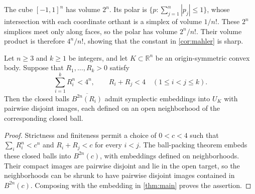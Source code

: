 \begin{remark}\label{rem:cube-volume-product}
The cube $[-1,1]^n$ has volume $2^n$. Its polar is $\{p:\sum_{j=1}^n|p_j|\le1\}$, whose intersection with each coordinate orthant is a simplex of volume $1/n!$. These $2^n$ simplices meet only along faces, so the polar has volume $2^n/n!$. Their volume product is therefore $4^n/n!$, showing that the constant in \cref{cor:mahler} is sharp.
\end{remark}

\begin{corollary}
\label{cor:polar-packings}
Let $n\ge3$ and $k\ge1$ be integers, and let $K\subset\mathbb{R}^n$ be an origin-symmetric convex body. Suppose that $R_1,\ldots,R_k>0$ satisfy
\[
 \sum_{i=1}^k R_i^n<4^n,
 \qquad R_i+R_j<4\quad(1\le i<j\le k).
\]
Then the closed balls $\overline{B^{2n}(R_i)}$ admit symplectic embeddings into $U_K$ with pairwise disjoint images, each defined on an open neighborhood of the corresponding closed ball.
\end{corollary}

\begin{proof}
Strictness and finiteness permit a choice of $0<c<4$ such that $\sum_i R_i^n<c^n$ and $R_i+R_j<c$ for every $i<j$. The ball-packing theorem \cite[Theorem~1.1]{OpenAIBallPackings2026} embeds these closed balls into $B^{2n}(c)$, with embeddings defined on neighborhoods. Their compact images are pairwise disjoint and lie in the open target, so the neighborhoods can be shrunk to have pairwise disjoint images contained in $B^{2n}(c)$. Composing with the embedding in \cref{thm:main} proves the assertion.
\end{proof}
